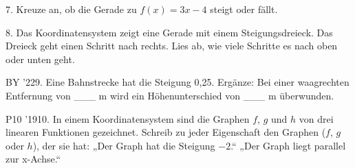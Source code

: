 \documentclass[11pt]{article}
\begin{document}
\begin{pfaufg}{}{7.}{}
Kreuze an, ob die Gerade zu $f(x) = 3x - 4$ steigt oder fällt. 
\end{pfaufg}
\begin{pfaufg}{}{8.}{}
Das Koordinatensystem zeigt eine Gerade mit einem Steigungsdreieck. Das Dreieck geht einen Schritt nach rechts. Lies ab, wie viele Schritte es nach oben oder unten geht.
\par\smallskip\noindent \begin{ksys}[xmin=-4,xmax=4,ymin=-5,ymax=5,ablesen]   \end{ksys}\par
\par\noindent \leerfeld[nach]  \leerfeld[\_\_] \par
{}
\end{pfaufg}
\pfgruppe{}
\begin{pfaufg}{BY ’22}{9.}{}
Eine Bahnstrecke hat die Steigung 0,25. Ergänze: Bei einer waagrechten Entfernung von \_\_\_ m wird ein Höhenunterschied von \_\_\_ m überwunden.
\end{pfaufg}
\begin{pfaufg}{P10 ’19}{10.}{}
In einem Koordinatensystem sind die Graphen $f$, $g$ und $h$ von drei linearen Funktionen gezeichnet. Schreib zu jeder Eigenschaft den Graphen ($f$, $g$ oder $h$), der sie hat: „Der Graph hat die Steigung $-2$.“ „Der Graph liegt parallel zur x-Achse.“
\par\smallskip\noindent {}\par
{}
\end{pfaufg}
\pfgruppe{}
\end{document}
